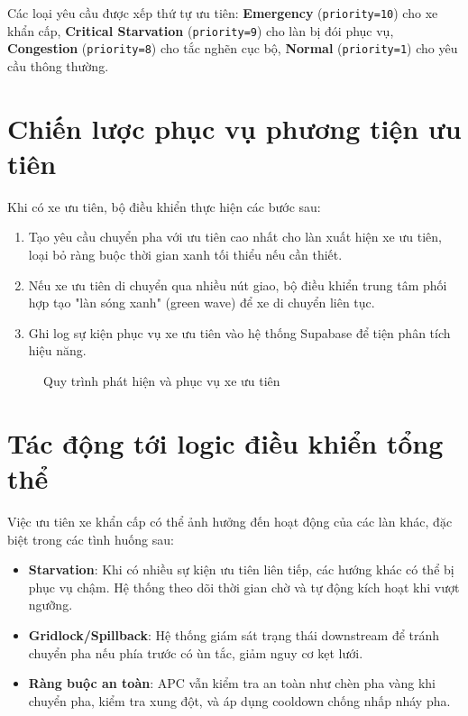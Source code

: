 Các loại yêu cầu được xếp thứ tự ưu tiên: \textbf{Emergency} (\texttt{priority=10}) cho xe khẩn cấp, \textbf{Critical Starvation} (\texttt{priority=9}) cho làn bị đói phục vụ, \textbf{Congestion} (\texttt{priority=8}) cho tắc nghẽn cục bộ, \textbf{Normal} (\texttt{priority=1}) cho yêu cầu thông thường.

\section{Chiến lược phục vụ phương tiện ưu tiên}

Khi có xe ưu tiên, bộ điều khiển thực hiện các bước sau:
\begin{enumerate}
    \item Tạo yêu cầu chuyển pha với ưu tiên cao nhất cho làn xuất hiện xe ưu tiên, loại bỏ ràng buộc thời gian xanh tối thiểu nếu cần thiết.
    \item Nếu xe ưu tiên di chuyển qua nhiều nút giao, bộ điều khiển trung tâm phối hợp tạo "làn sóng xanh" (green wave) để xe di chuyển liên tục.
    \item Ghi log sự kiện phục vụ xe ưu tiên vào hệ thống Supabase để tiện phân tích hiệu năng.
\end{enumerate}

\begin{figure}[H]
    \centering
    \caption{Quy trình phát hiện và phục vụ xe ưu tiên}
\end{figure}

\section{Tác động tới logic điều khiển tổng thể}

Việc ưu tiên xe khẩn cấp có thể ảnh hưởng đến hoạt động của các làn khác, đặc biệt trong các tình huống sau:
\begin{itemize}
    \item \textbf{Starvation}: Khi có nhiều sự kiện ưu tiên liên tiếp, các hướng khác có thể bị phục vụ chậm. Hệ thống theo dõi thời gian chờ và tự động kích hoạt khi vượt ngưỡng.
    \item \textbf{Gridlock/Spillback}: Hệ thống giám sát trạng thái downstream để tránh chuyển pha nếu phía trước có ùn tắc, giảm nguy cơ kẹt lưới.
    \item \textbf{Ràng buộc an toàn}: APC vẫn kiểm tra an toàn như chèn pha vàng khi chuyển pha, kiểm tra xung đột, và áp dụng cooldown chống nhấp nháy pha.
\end{itemize}

